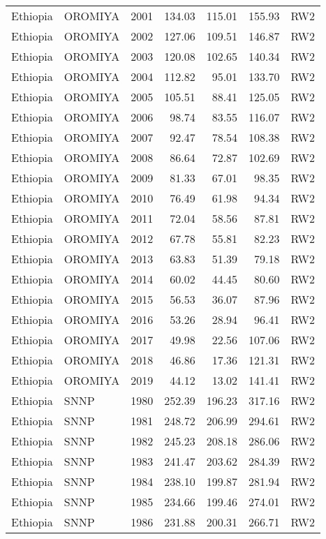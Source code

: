 \begin{longtable}{lllrrrl}
  Ethiopia & OROMIYA & 2001 & 134.03 & 115.01 & 155.93 & RW2 \\ 
  Ethiopia & OROMIYA & 2002 & 127.06 & 109.51 & 146.87 & RW2 \\ 
  Ethiopia & OROMIYA & 2003 & 120.08 & 102.65 & 140.34 & RW2 \\ 
  Ethiopia & OROMIYA & 2004 & 112.82 & 95.01 & 133.70 & RW2 \\ 
  Ethiopia & OROMIYA & 2005 & 105.51 & 88.41 & 125.05 & RW2 \\ 
  Ethiopia & OROMIYA & 2006 & 98.74 & 83.55 & 116.07 & RW2 \\ 
  Ethiopia & OROMIYA & 2007 & 92.47 & 78.54 & 108.38 & RW2 \\ 
  Ethiopia & OROMIYA & 2008 & 86.64 & 72.87 & 102.69 & RW2 \\ 
  Ethiopia & OROMIYA & 2009 & 81.33 & 67.01 & 98.35 & RW2 \\ 
  Ethiopia & OROMIYA & 2010 & 76.49 & 61.98 & 94.34 & RW2 \\ 
  Ethiopia & OROMIYA & 2011 & 72.04 & 58.56 & 87.81 & RW2 \\ 
  Ethiopia & OROMIYA & 2012 & 67.78 & 55.81 & 82.23 & RW2 \\ 
  Ethiopia & OROMIYA & 2013 & 63.83 & 51.39 & 79.18 & RW2 \\ 
  Ethiopia & OROMIYA & 2014 & 60.02 & 44.45 & 80.60 & RW2 \\ 
  Ethiopia & OROMIYA & 2015 & 56.53 & 36.07 & 87.96 & RW2 \\ 
  Ethiopia & OROMIYA & 2016 & 53.26 & 28.94 & 96.41 & RW2 \\ 
  Ethiopia & OROMIYA & 2017 & 49.98 & 22.56 & 107.06 & RW2 \\ 
  Ethiopia & OROMIYA & 2018 & 46.86 & 17.36 & 121.31 & RW2 \\ 
  Ethiopia & OROMIYA & 2019 & 44.12 & 13.02 & 141.41 & RW2 \\ 
  Ethiopia & SNNP & 1980 & 252.39 & 196.23 & 317.16 & RW2 \\ 
  Ethiopia & SNNP & 1981 & 248.72 & 206.99 & 294.61 & RW2 \\ 
  Ethiopia & SNNP & 1982 & 245.23 & 208.18 & 286.06 & RW2 \\ 
  Ethiopia & SNNP & 1983 & 241.47 & 203.62 & 284.39 & RW2 \\ 
  Ethiopia & SNNP & 1984 & 238.10 & 199.87 & 281.94 & RW2 \\ 
  Ethiopia & SNNP & 1985 & 234.66 & 199.46 & 274.01 & RW2 \\ 
  Ethiopia & SNNP & 1986 & 231.88 & 200.31 & 266.71 & RW2 \\ 

\end{longtable}
